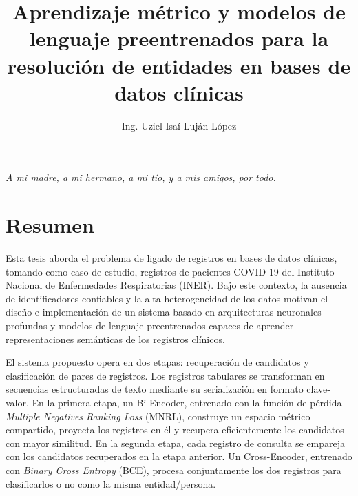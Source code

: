 \documentclass[letterpaper,12pt,twoside]{book}
\title{Aprendizaje métrico y modelos de lenguaje preentrenados para la resolución de entidades en bases de datos clínicas}
\author{Ing. Uziel Isaí Luján López}
\begin{document}
\maketitle

\frontmatter

\chapter*{}
\begin{flushright}
  \emph{A mi madre, a mi hermano, a mi tío, y a mis amigos, por todo. }
  \thispagestyle{empty}
\end{flushright}

\chapter*{Resumen}

Esta tesis aborda el problema de ligado de registros en bases de datos clínicas, tomando como caso de estudio, registros de pacientes COVID-19 del Instituto Nacional de Enfermedades Respiratorias (INER). Bajo este contexto, la ausencia de identificadores confiables y la alta heterogeneidad de los datos motivan el diseño e implementación de un sistema basado en arquitecturas neuronales profundas y modelos de lenguaje preentrenados capaces de aprender representaciones semánticas de los registros clínicos.

El sistema propuesto opera en dos etapas: recuperación de candidatos y clasificación de pares de registros. Los registros tabulares se transforman en secuencias estructuradas de texto mediante su serialización en formato clave-valor. En la primera etapa, un Bi-Encoder, entrenado con la función de pérdida \textit{Multiple Negatives Ranking Loss} (MNRL), construye un espacio métrico compartido, proyecta los registros en él y recupera eficientemente los candidatos con mayor similitud. En la segunda etapa, cada registro de consulta se empareja con los candidatos recuperados en la etapa anterior. Un Cross-Encoder, entrenado con \textit{Binary Cross Entropy} (BCE), procesa conjuntamente los dos registros para clasificarlos o no como la misma entidad/persona.
\end{document}
